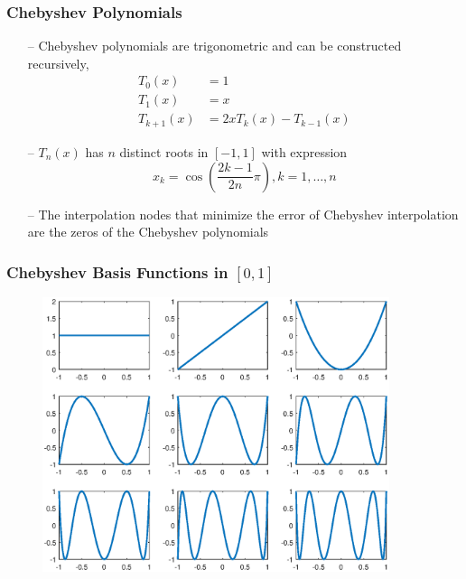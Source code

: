 \documentclass[aspectratio=169, 11pt]{beamer}
\begin{document}
\begin{frame}
\frametitle{Chebyshev Polynomials}
  \begin{itemize}
    \item[--] Chebyshev polynomials are trigonometric and can be constructed recursively,
    \begin{align*}
      T_{0}\left(x\right) & =1\\
      T_{1}\left(x\right) & =x\\
      T_{k+1}\left(x\right) & =2xT_{k}\left(x\right)-T_{k-1}\left(x\right)
    \end{align*}
    \bigskip
    \item[--] $T_{n}\left(x\right)$ has $n$ distinct roots in $\left[-1, 1\right]$ with expression
    \[
      x_{k}=\cos\left(\frac{2k-1}{2n}\pi\right),k=1,\ldots,n
    \]
    \bigskip
    \item[--] The interpolation nodes that minimize the error of Chebyshev interpolation are the zeros of the Chebyshev polynomials
  \end{itemize}
\end{frame}

\begin{frame}
\frametitle{Chebyshev Basis Functions in $\left[0,1\right]$}
  \begin{figure}
    \centering
    \includegraphics[width = 4in]{chebyshev.eps}
  \end{figure}
\end{frame}
\end{document}
